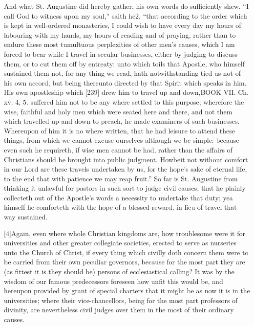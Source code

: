 And what St. Augustine did hereby gather, his own words do sufficiently shew. “I call God to witness upon my soul,” saith he2, “that according to the order which is kept in well-ordered monasteries, I could wish to have every day my hours of labouring with my hands, my hours of reading and of praying, rather than to endure these most tumultuous perplexities of other men’s causes, which I am forced to bear while I travel in secular businesses, either by judging to discuss them, or to cut them off by entreaty: unto which toils that Apostle, who himself sustained them not, for any thing we read, hath notwithstanding tied us not of his own accord, but being thereunto directed by that Spirit which speaks in him. His own apostleship which [239] drew him to travel up and down,BOOK VII. Ch. xv. 4, 5. suffered him not to be any where settled to this purpose; wherefore the wise, faithful and holy men which were seated here and there, and not them which travelled up and down to preach, he made examiners of such businesses. Whereupon of him it is no where written, that he had leisure to attend these things, from which we cannot excuse ourselves although we be simple: because even such he requireth, if wise men cannot be had, rather than the affairs of Christians should be brought into public judgment. Howbeit not without comfort in our Lord are these travels undertaken by us, for the hope’s sake of eternal life, to the end that with patience we may reap fruit.” So far is St. Augustine from thinking it unlawful for pastors in such sort to judge civil causes, that he plainly collecteth out of the Apostle’s words a necessity to undertake that duty; yea himself he comforteth with the hope of a blessed reward, in lieu of travel that way sustained.

[4]Again, even where whole Christian kingdoms are, how troublesome were it for universities and other greater collegiate societies, erected to serve as nurseries unto the Church of Christ, if every thing which civilly doth concern them were to be carried from their own peculiar governors, because for the most part they are (as fittest it is they should be) persons of ecclesiastical calling? It was by the wisdom of our famous predecessors foreseen how unfit this would be, and hereupon provided by grant of special charters that it might be as now it is in the universities; where their vice-chancellors, being for the most part professors of divinity, are nevertheless civil judges over them in the most of their ordinary causes.

